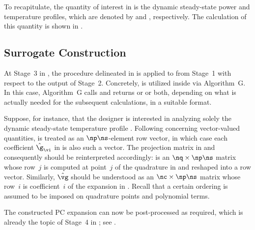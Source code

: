 To recapitulate, the quantity of interest \g in  is the
dynamic steady-state power and temperature profiles, which are denoted by \mp
and \mq, respectively. The calculation of this quantity is shown in
.

\subsection{Surrogate Construction}

At Stage~3 in , the procedure delineated in
 is applied to
 from Stage~1 with respect to the
output of Stage~2. Concretely,  is
utilized inside  via Algorithm~G. In this case,
Algorithm~G calls  and returns \mp
or \mq or both, depending on what is actually needed for the subsequent
calculations, in a suitable format.

Suppose, for instance, that the designer is interested in analyzing solely the
dynamic steady-state temperature profile \mq. Following
 concerning vector-valued quantities, \g is
treated as an $\np \ns$-element row vector, in which case each coefficient
$\hat{\g}_{\vi}$ in  is also such a vector. The projection
matrix in  and consequently
 should be reinterpreted accordingly: \vg is an $\nq
\times \np \ns$ matrix whose row~$j$ is \mq computed at point~$j$ of the
quadrature in  and reshaped into a row vector.
Similarly, $\hat{\vg}$ should be understood as an $\nc \times \np \ns$ matrix
whose row~$i$ is coefficient~$i$ of the expansion in .
Recall that a certain ordering is assumed to be imposed on quadrature points and
polynomial terms.

The constructed \ac{PC} expansion can now be post-processed as required, which
is already the topic of Stage~4 in ; see
.
